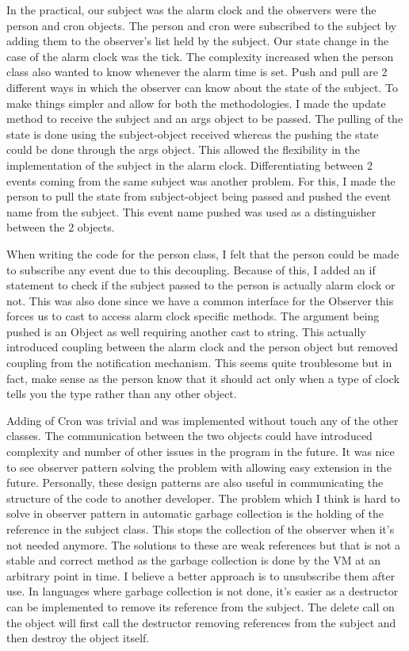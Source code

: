 In the practical, our subject was the alarm clock and the observers were the person and cron objects. The person and cron were subscribed to the subject by adding them to the observer's list held by the subject. Our state change in the case of the alarm clock was the tick. The complexity increased when the person class also wanted to know whenever the alarm time is set. Push and pull are 2 different ways in which the observer can know about the state of the subject. To make things simpler and allow for both the methodologies. I made the update method to receive the subject and an args object to be passed. The pulling of the state is done using the subject-object received whereas the pushing the state could be done through the args object. This allowed the flexibility in the implementation of the subject in the alarm clock. Differentiating between 2 events coming from the same subject was another problem. For this, I made the person to pull the state from subject-object being passed and pushed the event name from the subject. This event name pushed was used as a distinguisher between the 2 objects. 

When writing the code for the person class, I felt that the person could be made to subscribe any event due to this decoupling. Because of this, I added an if statement to check if the subject passed to the person is actually alarm clock or not. This was also done since we have a common interface for the Observer this forces us to cast to access alarm clock specific methods. The argument being pushed is an Object as well requiring another cast to string. This actually introduced coupling between the alarm clock and the person object but removed coupling from the notification mechanism. This seems quite troublesome but in fact, make sense as the person know that it should act only when a type of clock tells you the type rather than any other object. 

Adding of Cron was trivial and was implemented without touch any of the other classes. The communication between the two objects could have introduced complexity and number of other issues in the program in the future. It was nice to see observer pattern solving the problem with allowing easy extension in the future. Personally, these design patterns are also useful in communicating the structure of the code to another developer. The problem which I think is hard to solve in observer pattern in automatic garbage collection is the holding of the reference in the subject class. This stops the collection of the observer when it's not needed anymore. The solutions to these are weak references but that is not a stable and correct method as the garbage collection is done by the VM at an arbitrary point in time. I believe a better approach is to unsubscribe them after use. In languages where garbage collection is not done, it's easier as a destructor can be implemented to remove its reference from the subject. The delete call on the object will first call the destructor removing references from the subject and then destroy the object itself.

